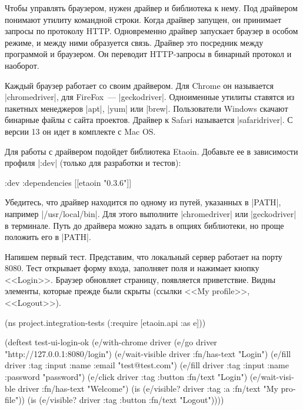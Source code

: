 Чтобы управлять браузером, нужен драйвер и библиотека к нему. Под драйвером
понимают утилиту командной строки. Когда драйвер запущен, он принимает запросы
по протоколу HTTP. Одновременно драйвер запускает браузер в особом режиме, и
между ними образуется связь. Драйвер это посредник между программой и
браузером. Он переводит HTTP-запросы в бинарный протокол и наоборот.

Каждый браузер работает со своим драйвером. Для Chrome он называется
\spverb|chromedriver|, для FireFox~--- \spverb|geckodriver|. Одноименные утилиты
ставятся из пакетных менеджеров \spverb|apt|, \spverb|yum| или
\spverb|brew|. Пользователи Windows скачают бинарные файлы с сайта
проектов. Драйвер к Safari называется \spverb|safaridriver|. С версии 13 он идет
в комплекте с Mac OS.

Для работы с драйвером подойдет библиотека Etaoin.
Добавьте ее в зависимости профиля \spverb|:dev| (только для разработки и тестов):

\begin{english}
  \begin{clojure}
:dev {:dependencies [[etaoin "0.3.6"]]}
  \end{clojure}
\end{english}

Убедитесь, что драйвер находится по одному из путей, указанных в \spverb|PATH|,
например \spverb|/usr/local/bin|. Для этого выполните \spverb|chromedriver| или
\spverb|geckodriver| в терминале. Путь до драйвера можно задать в опциях
библиотеки, но проще положить его в \spverb|PATH|.

Напишем первый тест. Представим, что локальный сервер работает на порту
8080. Тест открывает форму входа, заполняет поля и нажимает кнопку
<<Login>>. Браузер обновляет страницу, появляется приветствие. Видны элементы,
которые прежде были скрыты (ссылки <<My profile>>, <<Logout>>).

\begin{english}
  \begin{clojure}
(ns project.integration-tests
  (:require [etaoin.api :as e]))

(deftest test-ui-login-ok
  (e/with-chrome {} driver
    (e/go driver "http://127.0.0.1:8080/login")
    (e/wait-visible driver {:fn/has-text "Login"})
    (e/fill driver {:tag :input :name :email} "test@test.com")
    (e/fill driver {:tag :input :name :password} "password")
    (e/click driver {:tag :button :fn/text "Login"})
    (e/wait-visible driver {:fn/has-text "Welcome"})
    (is (e/visible? driver {:tag :a :fn/text "My profile"}))
    (is (e/visible? driver {:tag :button :fn/text "Logout"}))))
  \end{clojure}
\end{english}

